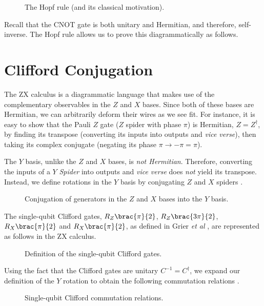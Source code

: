 \begin{figure}[H]
    \centering
    \caption{The Hopf rule (and its classical motivation).}
    \label{hopf}
\end{figure}

Recall that the CNOT gate is both unitary and Hermitian, and therefore, self-inverse. The Hopf rule allows us to prove this diagrammatically as follows.



\section{Clifford Conjugation}%
\label{clifford-conjugation}

The ZX calculus is a diagrammatic language that makes use of the complementary observables in the $Z$ and $X$ bases. Since both of these bases are Hermitian, we can arbitrarily deform their wires as we see fit. For instance, it is easy to show that the Pauli $Z$ gate ($Z$ spider with phase $\pi$) is Hermitian, $Z = Z^\dagger$, by finding its transpose (converting its inputs into outputs and \textit{vice verse}), then taking its complex conjugate (negating its phase $\pi \rightarrow -\pi = \pi$).


The $Y$ basis, unlike the $Z$ and $X$ bases, is \textit{not Hermitian}. Therefore, converting the inputs of a $Y$ \textit{Spider} into outputs and \textit{vice verse} does \textit{not} yield its transpose. Instead, we define rotations in the $Y$ basis by conjugating $Z$ and $X$ spiders \cite{Yeung2020}.

\begin{figure}[H]
    \centering
    \caption{Conjugation of generators in the $Z$ and $X$ bases into the $Y$ basis.}
    \label{pauli-Y}
\end{figure}

The single-qubit Clifford gates, $R_Z \brac{\pi}{2}$, $R_Z \brac{3\pi}{2}$, $R_X \brac{\pi}{2}$ and $R_X \brac{\pi}{2}$, as defined in Grier \textit{et al} \cite{Grier2016}, are represented as follows in the ZX calculus.

\begin{figure}[H]
    \centering
    \caption{Definition of the single-qubit Clifford gates.}
    \label{clifford-definitions}
\end{figure}


Using the fact that the Clifford gates are unitary $C^{-1} = C^\dagger$, we expand our definition of the $Y$ rotation to obtain the following commutation relations \cite{Yeung2020}.


\begin{figure}[H]
    \centering
    \caption{Single-qubit Clifford commutation relations.}
    \label{clifford-commutation}
\end{figure}

